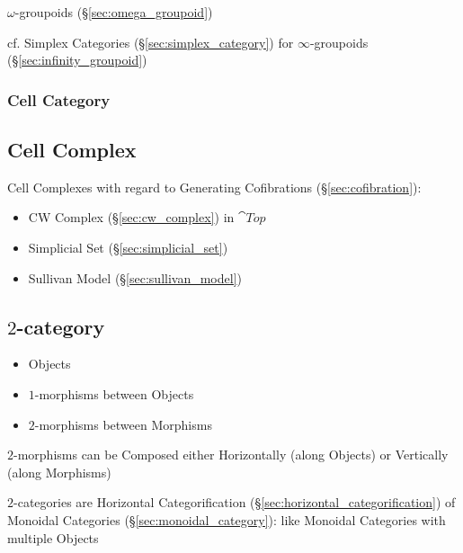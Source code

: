 $\omega$-groupoids (\S\ref{sec:omega_groupoid})

\fist cf. Simplex Categories (\S\ref{sec:simplex_category}) for
$\infty$-groupoids (\S\ref{sec:infinity_groupoid})



\subsubsection{Cell Category}\label{sec:cell_category}



\subsection{Cell Complex}\label{sec:cell_complex}

Cell Complexes with regard to Generating Cofibrations
(\S\ref{sec:cofibration}):
\begin{itemize}
\item CW Complex (\S\ref{sec:cw_complex}) in $\cat{Top}$
\item Simplicial Set (\S\ref{sec:simplicial_set})
\item Sullivan Model (\S\ref{sec:sullivan_model})
\end{itemize}



\subsection{$2$-category}\label{sec:2_category}

\begin{itemize}
  \item Objects
  \item $1$-morphisms between Objects
  \item $2$-morphisms between Morphisms
\end{itemize}

$2$-morphisms can be Composed either Horizontally (along Objects) or
Vertically (along Morphisms)

$2$-categories are Horizontal Categorification
(\S\ref{sec:horizontal_categorification}) of Monoidal Categories
(\S\ref{sec:monoidal_category}): like Monoidal Categories with
multiple Objects

